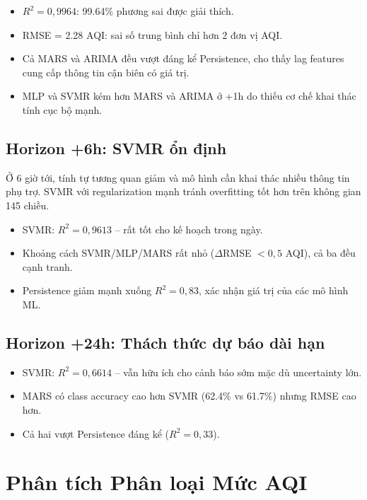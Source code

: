 \documentclass[12pt,a4paper]{report}
\begin{document}
\begin{itemize}
  \item $R^2 = 0{,}9964$: 99.64\% phương sai được giải thích.
  \item RMSE = 2.28 AQI: sai số trung bình chỉ hơn 2 đơn vị AQI.
  \item Cả MARS và ARIMA đều vượt đáng kể Persistence, cho thấy lag features cung cấp thông tin cận biên có giá trị.
  \item MLP và SVMR kém hơn MARS và ARIMA ở +1h do thiếu cơ chế khai thác tính cục bộ mạnh.
\end{itemize}

\subsection{Horizon +6h: SVMR ổn định}

Ở 6 giờ tới, tính tự tương quan giảm và mô hình cần khai thác nhiều thông tin phụ trợ. SVMR với regularization mạnh tránh overfitting tốt hơn trên không gian 145 chiều.

\begin{itemize}
  \item SVMR: $R^2 = 0{,}9613$ -- rất tốt cho kế hoạch trong ngày.
  \item Khoảng cách SVMR/MLP/MARS rất nhỏ ($\Delta$RMSE $< 0{,}5$ AQI), cả ba đều cạnh tranh.
  \item Persistence giảm mạnh xuống $R^2 = 0{,}83$, xác nhận giá trị của các mô hình ML.
\end{itemize}

\subsection{Horizon +24h: Thách thức dự báo dài hạn}

\begin{itemize}
  \item SVMR: $R^2 = 0{,}6614$ -- vẫn hữu ích cho cảnh báo sớm mặc dù uncertainty lớn.
  \item MARS có class accuracy cao hơn SVMR (62.4\% vs 61.7\%) nhưng RMSE cao hơn.
  \item Cả hai vượt Persistence đáng kể ($R^2 = 0{,}33$).
\end{itemize}

\section{Phân tích Phân loại Mức AQI}
\end{document}
